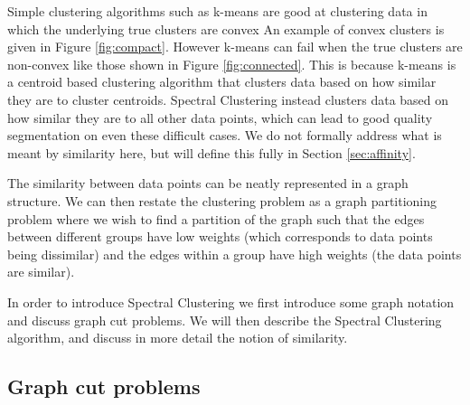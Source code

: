 Simple clustering algorithms such as k-means are good at clustering data in which the underlying true clusters are convex An example of convex clusters is given in Figure \ref{fig:compact}. However k-means can fail when the true clusters are non-convex like those shown in Figure \ref{fig:connected}. This is because k-means is a centroid based clustering algorithm that clusters data based on how similar they are to cluster centroids. Spectral Clustering instead clusters data based on how similar they are to all other data points, which can lead to good quality segmentation on even these difficult cases.  We do not formally address what is meant by similarity here, but will define this fully in Section \ref{sec:affinity}.


The similarity between data points can be neatly represented in a graph structure.  We can then restate the clustering problem as a graph partitioning problem where we wish to find a partition of the graph such that the edges between different groups have low weights (which corresponds to data points being dissimilar) and the edges within a group have high weights (the data points are similar).

In order to introduce Spectral Clustering we first introduce some graph notation and discuss graph cut problems. We will then describe the Spectral Clustering algorithm, and discuss in more detail the notion of similarity. 

\subsection{Graph cut problems} 

